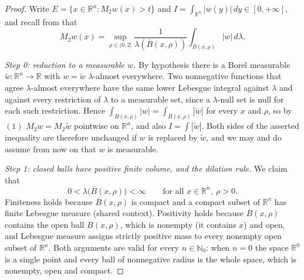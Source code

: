 \begin{proof}
Write $E = \{x \in \mathbb{R}^n : M_2w(x) > t\}$ and
$I = \int_{\mathbb{R}^n}|w(y)|\,dy \in [0,+\infty]$, and recall from
 that
\begin{equation*}
  M_2w(x) = \sup_{\rho \in (0,2]} \frac{1}{\lambda(\overline B(x,\rho))}
      \int_{\overline B(x,\rho)}|w|\,d\lambda . \tag{1}
\end{equation*}

\emph{Step 0: reduction to a measurable $w$.}
By hypothesis there is a Borel measurable $\widetilde w : \mathbb{R}^n \to
\mathbb{R}$ with $w = \widetilde w$ $\lambda$-almost everywhere.  Two
nonnegative functions that agree $\lambda$-almost everywhere have the same lower
Lebesgue integral against $\lambda$ and against every restriction of $\lambda$
to a measurable set, since a $\lambda$-null set is null for each such
restriction.  Hence $\int_{\overline B(x,\rho)}|w| = \int_{\overline
B(x,\rho)}|\widetilde w|$ for every $x$ and $\rho$, so by $(1)$ $M_2w = M_2
\widetilde w$ pointwise on $\mathbb{R}^n$, and also $I = \int|\widetilde w|$.
Both sides of the asserted inequality are therefore unchanged if $w$ is replaced
by $\widetilde w$, and we may and do assume from now on that $w$ is measurable.

\emph{Step 1: closed balls have positive finite volume, and the dilation rule.}
We claim that
\begin{equation*}
  0 < \lambda\bigl(\overline B(x,\rho)\bigr) < \infty
  \qquad\text{for all } x \in \mathbb{R}^n,\ \rho > 0 . \tag{2}
\end{equation*}
Finiteness holds because $\overline B(x,\rho)$ is compact and a compact subset
of $\mathbb{R}^n$ has finite Lebesgue measure (shared context).  Positivity
holds because $\overline B(x,\rho)$ contains the open ball $B(x,\rho)$, which
is nonempty (it contains $x$) and open, and Lebesgue measure assigns strictly
positive mass to every nonempty open subset of $\mathbb{R}^n$.  Both arguments
are valid for every $n \in \mathbb{N}_0$: when $n = 0$ the space $\mathbb{R}^0$
is a single point and every ball of nonnegative radius is the whole space,
which is nonempty, open and compact.


\end{proof}
